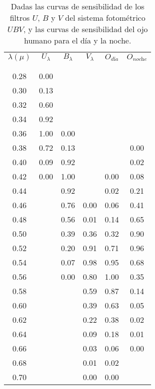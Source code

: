 \documentclass[12pt,spanish,a4paper]{practice}
\begin{document}
\begin{enumerate}[wide, labelwidth=!, labelindent=0pt, label=\textbf{\arabic*)}, ref=\arabic*]
        \begin{table}[h!]
            \centering
            \begin{tabular}{ c | c | c | c | c | c }
                $\lambda(\mu)$  & $U_\lambda$  & $B_\lambda$  & $V_\lambda$  & $O_{\textit{d\'ia}}$  & $O_{\textit{noche}}$ \\
                &  &  &  &  &  \\[-0.8em]\hline
                &  &  &  &  &  \\[-0.8em]
                0.28  & 0.00  &  &  &  &  \\
                0.30  & 0.13  &  &  &  &  \\
                0.32  & 0.60  &  &  &  &  \\
                0.34  & 0.92  &  &  &  &  \\
                0.36  & 1.00  & 0.00  &  &  &  \\
                0.38  & 0.72  & 0.13  &  &  & 0.00 \\
                0.40  & 0.09  & 0.92  &  &  & 0.02 \\
                0.42  & 0.00  & 1.00  &  & 0.00  & 0.08 \\
                0.44  &  & 0.92  &  & 0.02  & 0.21 \\
                0.46  &  & 0.76  & 0.00  & 0.06  & 0.41 \\
                0.48  &  & 0.56  & 0.01  & 0.14  & 0.65 \\
                0.50  &  & 0.39  & 0.36  & 0.32  & 0.90 \\
                0.52  &  & 0.20  & 0.91  & 0.71  & 0.96 \\
                0.54  &  & 0.07  & 0.98  & 0.95  & 0.68 \\
                0.56  &  & 0.00  & 0.80  & 1.00  & 0.35 \\
                0.58  &  &  & 0.59  & 0.87  & 0.14 \\
                0.60  &  &  & 0.39  & 0.63  & 0.05 \\
                0.62  &  &  & 0.22  & 0.38  & 0.02 \\
                0.64  &  &  & 0.09  & 0.18  & 0.01 \\
                0.66  &  &  & 0.03  & 0.06  & 0.00 \\
                0.68  &  &  & 0.01  & 0.02  &  \\
                0.70  &  &  & 0.00  & 0.00  &  \\
                \hline
            \end{tabular}
            \caption{
                Dadas las curvas de sensibilidad de los filtros $U$, $B$ y $V$ del sistema fotométrico $UBV$, y las curvas de sensibilidad del ojo humano para el día y la noche.
            }\label{table:1}
        \end{table}


\end{enumerate}
\end{document}
